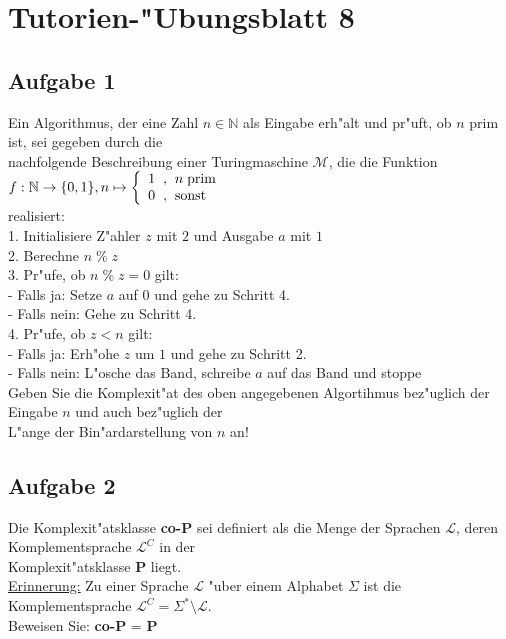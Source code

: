 \documentclass[10pt,oneside,onecolumn,a4paper,german,titlepage]{article}
\begin{document}
\section*{Tutorien-"Ubungsblatt 8}

\subsection*{Aufgabe 1}
Ein Algorithmus, der eine Zahl $n \in \mathbb{N}$ als Eingabe erh"alt und pr"uft,
ob $n$ prim ist, sei gegeben durch die\\
nachfolgende Beschreibung einer Turingmaschine $\mathcal{M}$, die die Funktion
$f: \mathbb{N} \to \{0,1\}, n \mapsto
\left\{\begin{array}{c@{\hspace{0.2cm},\hspace{0.2cm}}l}
1 & n \; \mbox{prim}\\0 & \mbox{sonst}
\end{array}\right.$\\
realisiert:\\[4pt]
1. Initialisiere Z"ahler $z$ mit $2$ und Ausgabe $a$ mit $1$\\
2. Berechne $n \; \% \; z$\\
3. Pr"ufe, ob $n \; \% \; z = 0$ gilt:\\
- Falls ja: Setze $a$ auf $0$ und gehe zu Schritt 4.\\
- Falls nein: Gehe zu Schritt 4.\\
4. Pr"ufe, ob $z < n$ gilt:\\
- Falls ja: Erh"ohe $z$ um $1$ und gehe zu Schritt 2.\\
- Falls nein: L"osche das Band, schreibe $a$ auf das Band und stoppe\\[4pt]
Geben Sie die Komplexit"at des oben angegebenen Algortihmus bez"uglich der Eingabe
$n$ und auch bez"uglich der\\
L"ange der Bin"ardarstellung von $n$ an!

\subsection*{Aufgabe 2}
Die Komplexit"atsklasse \textbf{co-P} sei definiert als die Menge der Sprachen
$\mathcal{L}$, deren Komplementsprache $\mathcal{L}^C$ in der\\
Komplexit"atsklasse \textbf{P} liegt.\\
\underline{Erinnerung:} Zu einer Sprache $\mathcal{L}$ "uber einem Alphabet $\Sigma$
ist die Komplementsprache $\mathcal{L}^C = \Sigma^* \setminus \mathcal{L}$.\\[4pt]
Beweisen Sie: \textbf{co-P} = \textbf{P}
\end{document}
